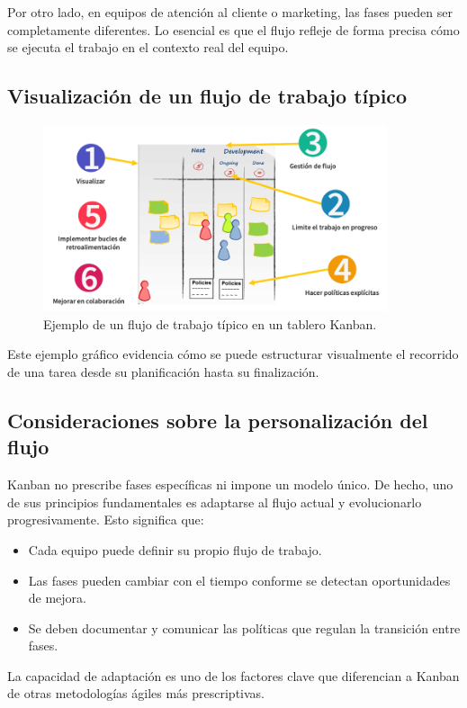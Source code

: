 Por otro lado, en equipos de atención al cliente o marketing, las fases pueden ser completamente diferentes. Lo esencial es que el flujo refleje de forma precisa cómo se ejecuta el trabajo en el contexto real del equipo.

\subsection{Visualización de un flujo de trabajo típico}

\begin{figure}[H]
\centering
\includegraphics[width=0.9\textwidth]{assets/images/flujo-kanban.png}
\caption{Ejemplo de un flujo de trabajo típico en un tablero Kanban.}
\end{figure}

Este ejemplo gráfico evidencia cómo se puede estructurar visualmente el recorrido de una tarea desde su planificación hasta su finalización.

\subsection{Consideraciones sobre la personalización del flujo}

Kanban no prescribe fases específicas ni impone un modelo único. De hecho, uno de sus principios fundamentales es adaptarse al flujo actual y evolucionarlo progresivamente. Esto significa que:
\begin{itemize}
    \item Cada equipo puede definir su propio flujo de trabajo.
    \item Las fases pueden cambiar con el tiempo conforme se detectan oportunidades de mejora.
    \item Se deben documentar y comunicar las políticas que regulan la transición entre fases.
\end{itemize}

La capacidad de adaptación es uno de los factores clave que diferencian a Kanban de otras metodologías ágiles más prescriptivas.

